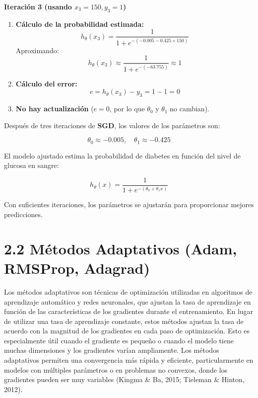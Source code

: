\documentclass[a5paper]{article}
\begin{document}
	\textbf{Iteración 3 (usando \( x_3 = 150, y_3 = 1 \))}
	
	\begin{enumerate}
		\item \textbf{Cálculo de la probabilidad estimada:}
		\[
		h_\theta(x_3) = \frac{1}{1 + e^{-(-0.005 - 0.425 \times 150)}}
		\]
		Aproximando:
		\[
		h_\theta(x_3) \approx \frac{1}{1 + e^{-(-63.755)}} \approx 1
		\]
		
		\item \textbf{Cálculo del error:}
		\[
		e = h_\theta(x_3) - y_3 = 1 - 1 = 0
		\]
		
		\item \textbf{No hay actualización} (\( e = 0 \), por lo que \( \theta_0 \) y \( \theta_1 \) no cambian).
	\end{enumerate}
	
	
	
	Después de tres iteraciones de \textbf{SGD}, los valores de los parámetros son:
	
	\[
	\theta_0 \approx -0.005, \quad \theta_1 \approx -0.425
	\]
	
	El modelo ajustado estima la probabilidad de diabetes en función del nivel de glucosa en sangre:
	
	\[
	h_\theta(x) = \frac{1}{1 + e^{-(\theta_0 + \theta_1 x)}}
	\]
	
	Con suficientes iteraciones, los parámetros se ajustarán para proporcionar mejores predicciones.
	
	
	
	\section*{2.2 Métodos Adaptativos (Adam, RMSProp, Adagrad)}
	
	Los métodos adaptativos son técnicas de optimización utilizadas en algoritmos de aprendizaje automático y redes neuronales, que ajustan la tasa de aprendizaje en función de las características de los gradientes durante el entrenamiento. En lugar de utilizar una tasa de aprendizaje constante, estos métodos ajustan la tasa de acuerdo con la magnitud de los gradientes en cada paso de optimización. Esto es especialmente útil cuando el gradiente es pequeño o cuando el modelo tiene muchas dimensiones y los gradientes varían ampliamente. Los métodos adaptativos permiten una convergencia más rápida y eficiente, particularmente en modelos con múltiples parámetros o en problemas no convexos, donde los gradientes pueden ser muy variables (Kingma \& Ba, 2015; Tieleman \& Hinton, 2012).
	
\end{document}
